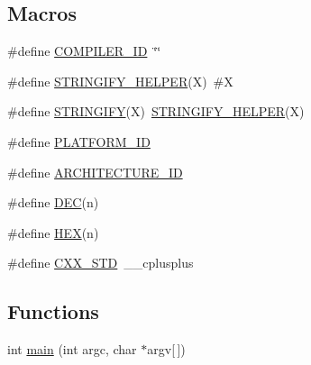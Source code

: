\subsection*{Macros}
\begin{DoxyCompactItemize}
\item 
\#define \mbox{\hyperlink{_compiler_2cmake-build-debug-use-llvm_2_c_make_files_23_814_83_2_compiler_id_c_x_x_2_c_make_c_x_x_compiler_id_8cpp_a81dee0709ded976b2e0319239f72d174}{C\+O\+M\+P\+I\+L\+E\+R\+\_\+\+ID}}~\char`\"{}\char`\"{}
\item 
\#define \mbox{\hyperlink{_compiler_2cmake-build-debug-use-llvm_2_c_make_files_23_814_83_2_compiler_id_c_x_x_2_c_make_c_x_x_compiler_id_8cpp_a2ae9b72bb13abaabfcf2ee0ba7d3fa1d}{S\+T\+R\+I\+N\+G\+I\+F\+Y\+\_\+\+H\+E\+L\+P\+ER}}(X)~\#X
\item 
\#define \mbox{\hyperlink{_compiler_2cmake-build-debug-use-llvm_2_c_make_files_23_814_83_2_compiler_id_c_x_x_2_c_make_c_x_x_compiler_id_8cpp_a43e1cad902b6477bec893cb6430bd6c8}{S\+T\+R\+I\+N\+G\+I\+FY}}(X)~\mbox{\hyperlink{_v_m_2cmake-build-debug_2_c_make_files_23_814_83_2_compiler_id_c_x_x_2_c_make_c_x_x_compiler_id_8cpp_a2ae9b72bb13abaabfcf2ee0ba7d3fa1d}{S\+T\+R\+I\+N\+G\+I\+F\+Y\+\_\+\+H\+E\+L\+P\+ER}}(X)
\item 
\#define \mbox{\hyperlink{_compiler_2cmake-build-debug-use-llvm_2_c_make_files_23_814_83_2_compiler_id_c_x_x_2_c_make_c_x_x_compiler_id_8cpp_adbc5372f40838899018fadbc89bd588b}{P\+L\+A\+T\+F\+O\+R\+M\+\_\+\+ID}}
\item 
\#define \mbox{\hyperlink{_compiler_2cmake-build-debug-use-llvm_2_c_make_files_23_814_83_2_compiler_id_c_x_x_2_c_make_c_x_x_compiler_id_8cpp_aba35d0d200deaeb06aee95ca297acb28}{A\+R\+C\+H\+I\+T\+E\+C\+T\+U\+R\+E\+\_\+\+ID}}
\item 
\#define \mbox{\hyperlink{_compiler_2cmake-build-debug-use-llvm_2_c_make_files_23_814_83_2_compiler_id_c_x_x_2_c_make_c_x_x_compiler_id_8cpp_ad1280362da42492bbc11aa78cbf776ad}{D\+EC}}(n)
\item 
\#define \mbox{\hyperlink{_compiler_2cmake-build-debug-use-llvm_2_c_make_files_23_814_83_2_compiler_id_c_x_x_2_c_make_c_x_x_compiler_id_8cpp_a46d5d95daa1bef867bd0179594310ed5}{H\+EX}}(n)
\item 
\#define \mbox{\hyperlink{_compiler_2cmake-build-debug-use-llvm_2_c_make_files_23_814_83_2_compiler_id_c_x_x_2_c_make_c_x_x_compiler_id_8cpp_a34cc889e576a1ae6c84ae9e0a851ba21}{C\+X\+X\+\_\+\+S\+TD}}~\+\_\+\+\_\+cplusplus
\end{DoxyCompactItemize}
\subsection*{Functions}
\begin{DoxyCompactItemize}
\item 
int \mbox{\hyperlink{_compiler_2cmake-build-debug-use-llvm_2_c_make_files_23_814_83_2_compiler_id_c_x_x_2_c_make_c_x_x_compiler_id_8cpp_a0ddf1224851353fc92bfbff6f499fa97}{main}} (int argc, char $\ast$argv\mbox{[}$\,$\mbox{]})
\end{DoxyCompactItemize}
